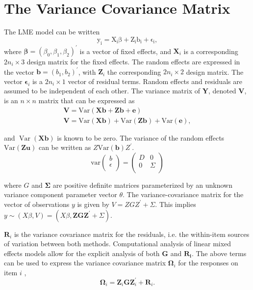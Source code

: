 \documentclass[12pt, a4paper]{report}
\theoremstyle{definition}
\theoremstyle{remark}
\begin{document}



\section{The Variance Covariance Matrix}
The LME model can be written
\[
\mathrm{y_{i}} = \mathrm{X_{i}\beta} + \mathrm{Z_{i}b_{i}} + \mathrm{\epsilon_{i}},
\]
where $\boldsymbol{\beta}=(\beta_0,\beta_1,\beta_2)^\prime$ is a vector of fixed effects, and $\boldsymbol{X}_i$ is a corresponding $2n_i\times 3$ design matrix for the fixed effects. The random effects are expressed in the vector $\boldsymbol{b}=(b_1,b_2)^\prime$, with $\boldsymbol{Z}_i$ the corresponding $2n_i\times 2$ design matrix. The vector $\boldsymbol{\epsilon}_i$ is a $2n_i\times 1$ vector of residual terms. Random effects and residuals are assumed to be independent of each other.
The variance matrix of \textbf{Y}, denoted \textbf{V}, is an $n \times n$ matrix that can be expressed
as 
\begin{eqnarray}
\textbf{V}= \textrm{Var} ( \textbf{Xb} + \textbf{Zb} + \textbf{e})\\
\textbf{V}= \textrm{Var} ( \textbf{Xb} ) + \textrm{Var} (\textbf{Zb}) +
\textrm{Var}(\textbf{e}),
\end{eqnarray}


and $\operatorname{Var}(\textbf{Xb})$ is known to be zero. The variance of the
random effects $\mbox{Var}(\textbf{Zu})$ can be written as
$Z\mbox{Var}(\textbf{b})Z^{\prime}$.
\[
\mathrm{var}
\left(
\begin{array}{c}
b \\
\epsilon \\
\end{array}
\right)
=
\left(
\begin{array}{cc}
D & 0 \\
0 & \Sigma \\
\end{array}
\right)
\]




where $G$ and $\boldsymbol{\Sigma}$ are positive definite matrices parameterized by an unknown variance component parameter vector $ \theta.$ The variance-covariance matrix for the vector of observations $y$ is given by $V = ZGZ^{\prime}+ \Sigma.$ This implies $y \sim(X\beta, V) = (X\beta, \boldsymbol{ZGZ}^{\prime}+ \Sigma)$. 

$\boldsymbol{R}_{i}$ is the variance covariance matrix for the residuals, i.e. the within-item sources of variation between both methods. Computational analysis of linear mixed effects models allow for the explicit analysis of both $\boldsymbol{G}$ and $\boldsymbol{R_i}$.
The above terms can be used to express the  variance covariance matrix $\boldsymbol{\Omega}_i$ for the responses on item $i$ ,
\[
\boldsymbol{\Omega}_i = \boldsymbol{Z}_i \boldsymbol{G} \boldsymbol{Z}_i^{\prime} + \boldsymbol{R}_i.
\]
\end{document}
